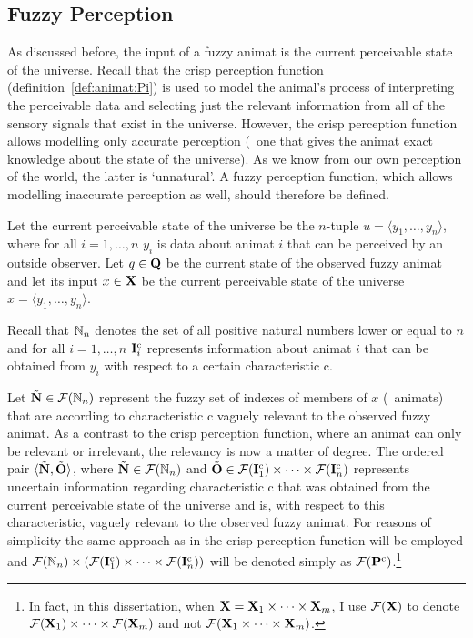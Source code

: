 \subsection{Fuzzy Perception}
As discussed before, the input of a fuzzy animat is the current perceivable state of the universe. Recall that the crisp perception function (definition~\ref{def:animat:Pi}) is used to model the animal's process of interpreting the perceivable data and selecting just the relevant information from all of the sensory signals that exist in the universe. However, the crisp perception function allows modelling only accurate perception (\ie\ one that gives the animat exact knowledge about the state of the universe). As we know from our own perception of the world, the latter is `unnatural'. A fuzzy perception function, which allows modelling inaccurate perception as well, should therefore be defined.

Let the current perceivable state of the universe be the $n$-tuple $u=\langle y_1,\ldots,y_n \rangle$, where for all $i=1,\ldots,n$ $y_i$ is data about animat $i$ that can be perceived by an outside observer. Let $q \in {\ensuremath{\mathbf{Q}}}$ be the current state of the observed fuzzy animat and let its input $x \in {\ensuremath{\mathbf{X}}}$ be the current perceivable state of the universe $x=\langle y_1,\ldots,y_n \rangle$. 

Recall that $\mathbb{N}_n$ denotes the set of all positive natural numbers lower or equal to $n$ and for all $i=1,\ldots,n$ ${\mathbf{I}}^\mathrm{c}_i$ represents information about animat $i$ that can be obtained from $y_i$ with respect to a certain characteristic $\mathrm{c}$.

Let ${\tilde{{\mathbf{N}}}} \in {\ensuremath{\mathcal{F}(\mathbb{N}_n)}}$ represent the fuzzy set of indexes of members of $x$ (\ie\ animats) that are according to characteristic $\mathrm{c}$ vaguely relevant to the observed fuzzy animat. As a contrast to the crisp perception function, where an animat can only be relevant or irrelevant, the relevancy is now a matter of degree. The ordered pair $\langle{\ensuremath{\tilde{{\mathbf{N}}}}},{\tilde{{\mathbf{O}}}}\rangle$, where ${\tilde{{\mathbf{N}}}} \in {\ensuremath{\mathcal{F}(\mathbb{N}_n)}}$ and ${\tilde{{\mathbf{O}}}} \in {\ensuremath{\mathcal{F}({\mathbf{I}}^\mathrm{c}_1)}} \times \cdots \times {\ensuremath{\mathcal{F}({\mathbf{I}}^\mathrm{c}_n)}}$ represents uncertain information regarding characteristic $\mathrm{c}$ that was obtained from the current perceivable state of the universe and is, with respect to this characteristic, vaguely relevant to the observed fuzzy animat. For reasons of simplicity the same approach as in the crisp perception function will be employed and ${\mathcal{F}(\mathbb{N}_n)} \times ({\mathcal{F}({\mathbf{I}}^\mathrm{c}_1)} \times \cdots \times {\ensuremath{\mathcal{F}({\mathbf{I}}^\mathrm{c}_n)}})$ will be denoted simply as ${\mathcal{F}({\mathbf{P}}^\mathrm{c})}$.\footnote{In fact, in this dissertation, when ${\mathbf{X}}={\mathbf{X}}_1 \times \cdots \times {\ensuremath{\mathbf{X}}}_m$, I use ${\mathcal{F}({\mathbf{X}})}$ to denote ${\mathcal{F}({\mathbf{X}}_1)} \times \cdots \times {\ensuremath{\mathcal{F}({\mathbf{X}}_m)}}$ and not ${\mathcal{F}({\mathbf{X}}_1 \times \cdots \times {\ensuremath{\mathbf{X}}}_m)}$.}

